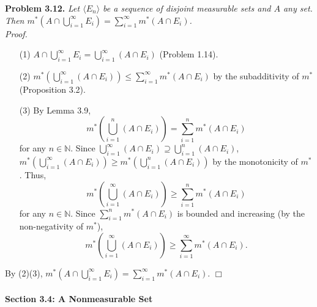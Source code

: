 \documentclass{article}
\begin{document}



\textbf{Problem 3.12.}
\emph{Let $\langle E_n \rangle$ be a sequence of disjoint measurable sets and $A$ any set.
Then
$m^{*}\left( A \cap \bigcup_{i=1}^{\infty}E_i \right)
= \sum_{i=1}^{\infty} m^{*}(A \cap E_i)$.} \\



\emph{Proof.}
\begin{enumerate}
\item[(1)]
  $A \cap \bigcup_{i=1}^{\infty}E_i
  = \bigcup_{i=1}^{\infty}(A \cap E_i)$ (Problem 1.14).

\item[(2)]
  $m^{*}\left( \bigcup_{i=1}^{\infty}(A \cap E_i) \right)
  \leq \sum_{i=1}^{\infty} m^{*}(A \cap E_i)$
  by the subadditivity of $m^{*}$ (Proposition 3.2).

\item[(3)]
  By Lemma 3.9,
  $$m^{*}\left( \bigcup_{i=1}^{n}(A \cap E_i) \right)
  = \sum_{i=1}^{n} m^{*}(A \cap E_i)$$
  for any $n \in \mathbb{N}$.
  Since
  $\bigcup_{i=1}^{\infty}(A \cap E_i) \supseteq \bigcup_{i=1}^{n}(A \cap E_i)$,
  $m^{*}\left( \bigcup_{i=1}^{\infty}(A \cap E_i) \right)
  \geq m^{*}\left( \bigcup_{i=1}^{n}(A \cap E_i) \right)$ by the monotonicity of $m^{*}$.
  Thus,
  \[
    m^{*}\left( \bigcup_{i=1}^{\infty}(A \cap E_i) \right)
    \geq
    \sum_{i=1}^{n} m^{*}(A \cap E_i)
  \]
  for any $n \in \mathbb{N}$.
  Since $\sum_{i=1}^{n} m^{*}(A \cap E_i)$ is bounded and increasing
  (by the non-negativity of $m^{*}$),
  \[
    m^{*}\left( \bigcup_{i=1}^{\infty}(A \cap E_i) \right)
    \geq
    \sum_{i=1}^{\infty} m^{*}(A \cap E_i).
  \]
\end{enumerate}
By (2)(3),
$m^{*}\left( A \cap \bigcup_{i=1}^{\infty}E_i \right)
= \sum_{i=1}^{\infty} m^{*}(A \cap E_i)$.
$\Box$ \\\\






\textbf{\large Section 3.4: A Nonmeasurable Set} \\\\
\end{document}
